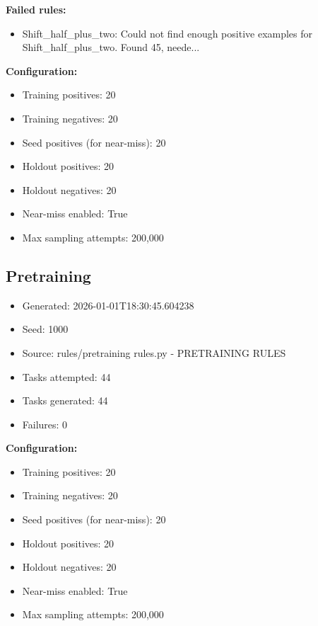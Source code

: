 \documentclass[10pt,a4paper]{article}
\begin{document}
\textbf{Failed rules:}
\begin{itemize}
\item Shift\_half\_plus\_two: Could not find enough positive examples for Shift\_half\_plus\_two. Found 45, neede...
\end{itemize}

\textbf{Configuration:}
\begin{itemize}
\item Training positives: 20
\item Training negatives: 20
\item Seed positives (for near-miss): 20
\item Holdout positives: 20
\item Holdout negatives: 20
\item Near-miss enabled: True
\item Max sampling attempts: 200,000
\end{itemize}

\subsection{Pretraining}

\begin{itemize}
\item Generated: 2026-01-01T18:30:45.604238
\item Seed: 1000
\item Source: rules/pretraining rules.py - PRETRAINING RULES
\item Tasks attempted: 44
\item Tasks generated: 44
\item Failures: 0
\end{itemize}

\textbf{Configuration:}
\begin{itemize}
\item Training positives: 20
\item Training negatives: 20
\item Seed positives (for near-miss): 20
\item Holdout positives: 20
\item Holdout negatives: 20
\item Near-miss enabled: True
\item Max sampling attempts: 200,000
\end{itemize}
\end{document}

